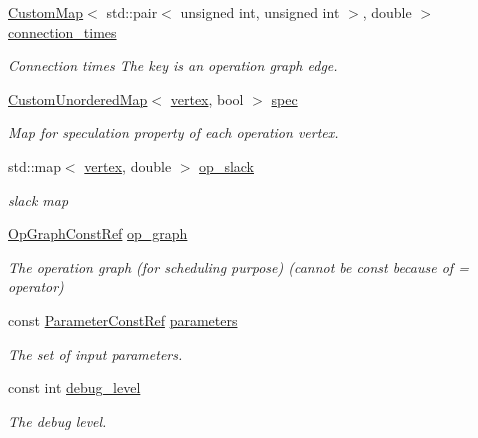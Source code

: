 \begin{DoxyCompactItemize}
\hyperlink{custom__map_8hpp_a18ca01763abbe3e5623223bfe5aaac6b}{Custom\+Map}$<$ std\+::pair$<$ unsigned int, unsigned int $>$, double $>$ \hyperlink{classSchedule_a9c313308e88d070672b9466ebae89d32}{connection\+\_\+times}
\begin{DoxyCompactList}\small\item\em Connection times The key is an operation graph edge. \end{DoxyCompactList}\item 
\hyperlink{custom__map_8hpp_ad1ed68f2ff093683ab1a33522b144adc}{Custom\+Unordered\+Map}$<$ \hyperlink{graph_8hpp_abefdcf0544e601805af44eca032cca14}{vertex}, bool $>$ \hyperlink{classSchedule_adbcbb1238dd11219d751c7fd28c8b44f}{spec}
\begin{DoxyCompactList}\small\item\em Map for speculation property of each operation vertex. \end{DoxyCompactList}\item 
std\+::map$<$ \hyperlink{graph_8hpp_abefdcf0544e601805af44eca032cca14}{vertex}, double $>$ \hyperlink{classSchedule_a9bd31f768fd00bc8d3a3eb1b3bd4c332}{op\+\_\+slack}
\begin{DoxyCompactList}\small\item\em slack map \end{DoxyCompactList}\item 
\hyperlink{op__graph_8hpp_a9a0b240622c47584bee6951a6f5de746}{Op\+Graph\+Const\+Ref} \hyperlink{classSchedule_a3b416a5141bab0d0cca415dcc4e5c12d}{op\+\_\+graph}
\begin{DoxyCompactList}\small\item\em The operation graph (for scheduling purpose) (cannot be const because of = operator) \end{DoxyCompactList}\item 
const \hyperlink{Parameter_8hpp_a37841774a6fcb479b597fdf8955eb4ea}{Parameter\+Const\+Ref} \hyperlink{classSchedule_aceedbf18bb7e3a43b66df301ce21325f}{parameters}
\begin{DoxyCompactList}\small\item\em The set of input parameters. \end{DoxyCompactList}\item 
const int \hyperlink{classSchedule_a730ba60c8d53bd88d6a38c7bd005abd5}{debug\+\_\+level}
\begin{DoxyCompactList}\small\item\em The debug level. \end{DoxyCompactList}\end{DoxyCompactItemize}
